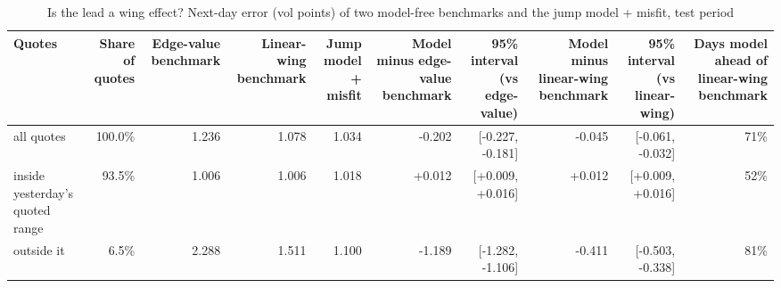 \begin{table}[ht]
\centering
\small
\caption{Is the lead a wing effect? Next-day error (vol points) of two model-free benchmarks and the jump model + misfit, test period}
\begin{tabular}{lrrrrrrrrr}
\toprule
Quotes & Share of quotes & Edge-value benchmark & Linear-wing benchmark & Jump model + misfit & Model minus edge-value benchmark & 95\% interval (vs edge-value) & Model minus linear-wing benchmark & 95\% interval (vs linear-wing) & Days model ahead of linear-wing benchmark \\
\midrule
all quotes & 100.0\% & 1.236 & 1.078 & 1.034 & -0.202 & [-0.227, -0.181] & -0.045 & [-0.061, -0.032] & 71\% \\
inside yesterday's quoted range & 93.5\% & 1.006 & 1.006 & 1.018 & +0.012 & [+0.009, +0.016] & +0.012 & [+0.009, +0.016] & 52\% \\
outside it & 6.5\% & 2.288 & 1.511 & 1.100 & -1.189 & [-1.282, -1.106] & -0.411 & [-0.503, -0.338] & 81\% \\
\bottomrule
\end{tabular}
\par{}
\end{table}
